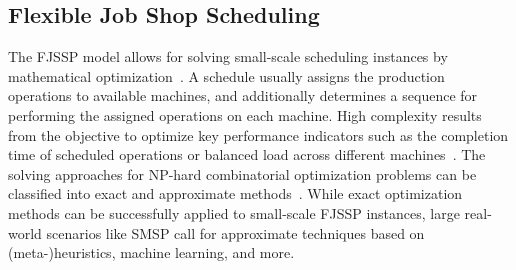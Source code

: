 \subsection{Flexible Job Shop Scheduling}
The FJSSP model allows for solving small-scale scheduling instances by mathematical optimization~\cite{dauzere2024flexible}.
A schedule usually assigns the production operations to available machines, and additionally determines a sequence for performing the assigned operations on each machine.
High complexity results from the objective to
optimize key performance indicators such as the completion time of scheduled operations or balanced load across different machines~\cite{schumann2022scheduling}.
%
%
The solving approaches for NP-hard combinatorial optimization problems can be classified into exact and approximate methods~\cite{lei2022multi}.
While exact optimization methods can be successfully applied to small-scale FJSSP instances, large real-world scenarios like SMSP call for approximate techniques based on (meta\nobreakdash-)heuristics, machine learning, and more.

